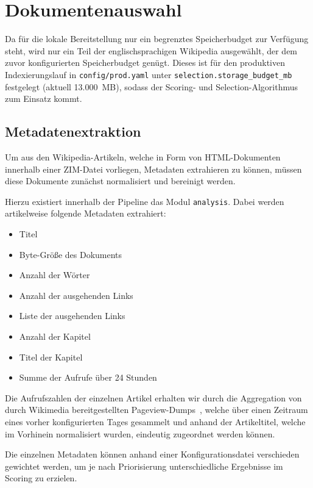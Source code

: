 \par\addvspace{1em}
\noindent\begin{minipage}[t]{\linewidth}
\vspace{0pt}
\chapter{Dokumentenauswahl}
\label{ch:dokumentenauswahl}

Da für die lokale Bereitstellung nur ein begrenztes Speicherbudget zur
Verfügung steht, wird nur ein Teil der englischsprachigen Wikipedia
ausgewählt, der dem zuvor konfigurierten Speicherbudget genügt. Dieses ist für den produktiven Indexierungslauf
in \texttt{config/prod.yaml} unter
\texttt{selection.\allowbreak{}storage\_\allowbreak{}budget\_\allowbreak{}mb} festgelegt
(aktuell 13.000~MB), sodass der Scoring- und Selection-Algorithmus zum Einsatz kommt.

\section{Metadatenextraktion}

Um aus den Wikipedia-Artikeln, welche in Form von HTML-Dokumenten innerhalb
einer ZIM-Datei vorliegen, Metadaten extrahieren zu können, müssen diese
Dokumente zunächst normalisiert und bereinigt
werden.

Hierzu existiert innerhalb der Pipeline das Modul \texttt{analysis}. Dabei werden artikelweise folgende
Metadaten extrahiert:

\begin{itemize}
    \item Titel
    \item Byte-Größe des Dokuments
    \item Anzahl der Wörter
    \item Anzahl der ausgehenden Links
    \item Liste der ausgehenden Links
    \item Anzahl der Kapitel
    \item Titel der Kapitel
    \item Summe der Aufrufe über 24 Stunden
\end{itemize}

Die Aufrufszahlen der einzelnen Artikel erhalten wir durch die Aggregation von durch Wikimedia bereitgestellten Pageview-Dumps~\cite{wikimedia-pageviews}, welche
über einen Zeitraum eines vorher konfigurierten Tages gesammelt und anhand der Artikeltitel, welche im Vorhinein normalisiert wurden, eindeutig
zugeordnet werden können.

Die einzelnen Metadaten können anhand einer Konfigurationsdatei verschieden gewichtet werden, um je nach Priorisierung unterschiedliche Ergebnisse im Scoring zu erzielen.

\end{minipage}\par\addvspace{1em}


